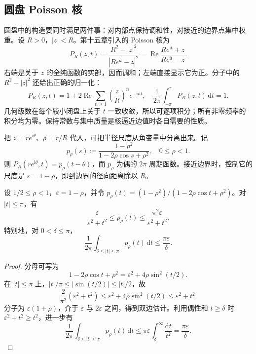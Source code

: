 \subsection{圆盘 Poisson 核}
\label{b3:subsec:160102}

圆盘中的构造要同时满足两件事：对内部点保持调和性，对接近的边界点集中权重。设 \(R>0\)，\(|z|<R\)。第十五章引入的 Poisson 核为
\[
 P_R(z,t)=\frac{R^2-|z|^2}{|Re^{\mathrm i t}-z|^2}
 =\operatorname{Re}\frac{Re^{\mathrm i t}+z}{Re^{\mathrm i t}-z}.
\]
右端是关于 \(z\) 的全纯函数的实部，因而调和；左端直接显示它为正。分子中的 \(R^2-|z|^2\) 还给出正确的归一化：
\[
 P_R(z,t)=1+2\operatorname{Re}\sum_{n\ge1}
       \left(\frac zR\right)^n e^{-\mathrm i nt},
 \quad
 \frac1{2\pi}\int_{-\pi}^{\pi}P_R(z,t)\,\mathrm dt=1.
\]
几何级数在每个较小闭盘上关于 \(t\) 一致收敛，所以可逐项积分；所有非零频率的积分均为零。保持常数与集中质量是核逼近边值时各自需要的性质。

\ProseParagraphBreak
把 \(z=re^{\mathrm i\theta}\)、\(\rho=r/R\) 代入，可把半径尺度从角变量中分离出来。记
\[
 p_\rho(s)\coloneqq
 \frac{1-\rho^2}{1-2\rho\cos s+\rho^2},
 \quad 0\le\rho<1.
\]
则 \(P_R(re^{\mathrm i\theta},t)=p_\rho(t-\theta)\)，而 \(p_\rho\) 为偶的 \(2\pi\) 周期函数。接近边界时，控制它的尺度是 \(\varepsilon=1-\rho\)，即到边界的径向距离除以 \(R\)。

\begin{lemma}\label{b3:lem:16-poisson-localization}
设 \(1/2\le\rho<1\)，\(\varepsilon=1-\rho\)，并令
\(p_\rho(t)=(1-\rho^2)/(1-2\rho\cos t+\rho^2)\)。对 \(|t|\le\pi\)，有
\[
 \frac{\varepsilon}{\varepsilon^2+t^2}
 \le p_\rho(t)
 \le\frac{\pi^2\varepsilon}{\varepsilon^2+t^2}.
\]
特别地，对 \(0<\delta\le\pi\)，
\[
 \frac1{2\pi}\int_{\delta\le|t|\le\pi}p_\rho(t)\,\mathrm dt
 \le\frac{\pi\varepsilon}{\delta}.
\]
\end{lemma}
\begin{proof}
分母可写为
\[
 1-2\rho\cos t+\rho^2
 =\varepsilon^2+4\rho\sin^2(t/2).
\]
在 \(|t|\le\pi\) 上，\(|t|/\pi\le|\sin(t/2)|\le|t|/2\)，故
\[
 \frac2{\pi^2}(\varepsilon^2+t^2)
 \le\varepsilon^2+4\rho\sin^2(t/2)
 \le\varepsilon^2+t^2.
\]
分子为 \(\varepsilon(1+\rho)\)，介于 \(\varepsilon\) 与 \(2\varepsilon\) 之间，得到双边估计。利用偶性和 \(t\ge\delta\) 时 \(\varepsilon^2+t^2\ge t^2\)，进一步有
\[
 \frac1{2\pi}\int_{\delta\le|t|\le\pi}p_\rho(t)\,\mathrm dt
 \le\pi\varepsilon\int_\delta^\infty\frac{\mathrm dt}{t^2}
 =\frac{\pi\varepsilon}{\delta}.
\]
\end{proof}


